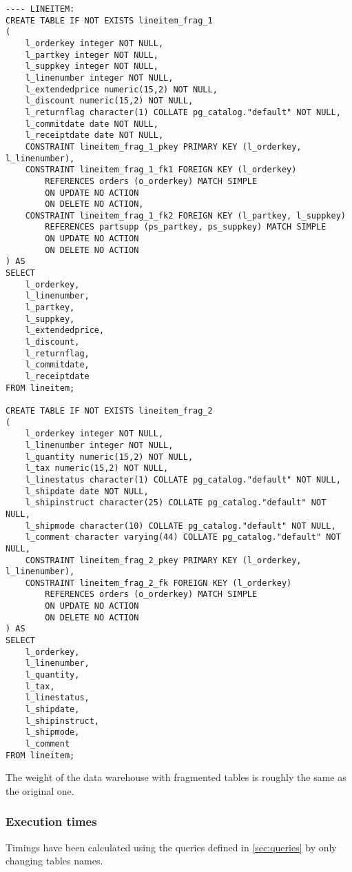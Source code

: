 \begin{lstlisting}
---- LINEITEM:
CREATE TABLE IF NOT EXISTS lineitem_frag_1
(
    l_orderkey integer NOT NULL,
    l_partkey integer NOT NULL,
    l_suppkey integer NOT NULL,
    l_linenumber integer NOT NULL,
    l_extendedprice numeric(15,2) NOT NULL,
    l_discount numeric(15,2) NOT NULL,
    l_returnflag character(1) COLLATE pg_catalog."default" NOT NULL,
    l_commitdate date NOT NULL,
    l_receiptdate date NOT NULL,
    CONSTRAINT lineitem_frag_1_pkey PRIMARY KEY (l_orderkey, l_linenumber),
    CONSTRAINT lineitem_frag_1_fk1 FOREIGN KEY (l_orderkey)
        REFERENCES orders (o_orderkey) MATCH SIMPLE
        ON UPDATE NO ACTION
        ON DELETE NO ACTION,
    CONSTRAINT lineitem_frag_1_fk2 FOREIGN KEY (l_partkey, l_suppkey)
        REFERENCES partsupp (ps_partkey, ps_suppkey) MATCH SIMPLE
        ON UPDATE NO ACTION
        ON DELETE NO ACTION
) AS
SELECT
	l_orderkey,
	l_linenumber,
	l_partkey,
	l_suppkey,
	l_extendedprice,
	l_discount,
	l_returnflag,
	l_commitdate,
	l_receiptdate
FROM lineitem;

CREATE TABLE IF NOT EXISTS lineitem_frag_2
(
    l_orderkey integer NOT NULL,
    l_linenumber integer NOT NULL,
    l_quantity numeric(15,2) NOT NULL,
    l_tax numeric(15,2) NOT NULL,
    l_linestatus character(1) COLLATE pg_catalog."default" NOT NULL,
    l_shipdate date NOT NULL,
    l_shipinstruct character(25) COLLATE pg_catalog."default" NOT NULL,
    l_shipmode character(10) COLLATE pg_catalog."default" NOT NULL,
    l_comment character varying(44) COLLATE pg_catalog."default" NOT NULL,
    CONSTRAINT lineitem_frag_2_pkey PRIMARY KEY (l_orderkey, l_linenumber),
    CONSTRAINT lineitem_frag_2_fk FOREIGN KEY (l_orderkey)
        REFERENCES orders (o_orderkey) MATCH SIMPLE
        ON UPDATE NO ACTION
        ON DELETE NO ACTION
) AS
SELECT
	l_orderkey,
	l_linenumber,
	l_quantity,
	l_tax,
	l_linestatus,
	l_shipdate,
	l_shipinstruct,
	l_shipmode,
	l_comment
FROM lineitem;
\end{lstlisting}

The weight of the data warehouse with fragmented tables is roughly the same as the original one.

\subsubsection{Execution times}

Timings have been calculated using the queries defined in \autoref{sec:queries} by only changing tables names.

